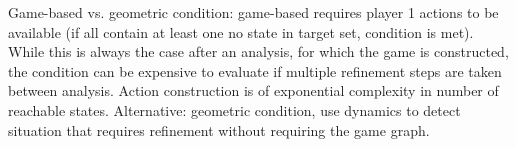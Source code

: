 Game-based vs. geometric condition: game-based requires player 1 actions to be available (if all contain at least one no state in target set, condition is met).
While this is always the case after an analysis, for which the game is constructed, the condition can be expensive to evaluate if multiple refinement steps are taken between analysis.
Action construction is of exponential complexity in number of reachable states.
Alternative: geometric condition, use dynamics to detect situation that requires refinement without requiring the game graph.

